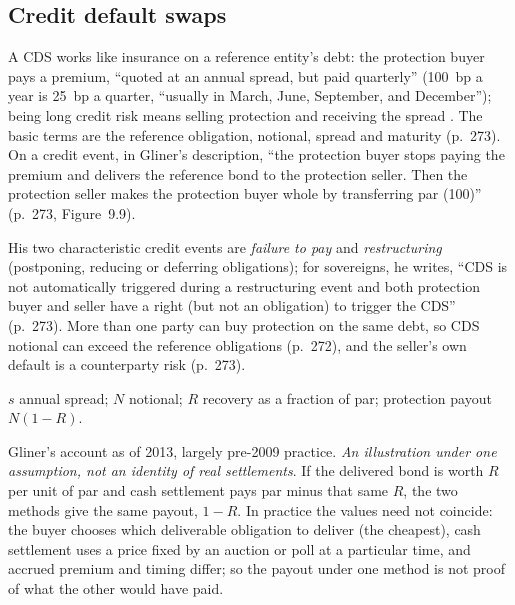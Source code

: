 \subsection{Credit default swaps}

\begin{qfmechanism}\label{mech:cds-contract-credit-events}
 A CDS works like insurance on a reference entity's debt: the protection buyer pays a premium, ``quoted at an annual spread, but paid quarterly'' (100~bp a year is 25~bp a quarter, ``usually in March, June, September, and December''); being long credit risk means selling protection and receiving the spread \citep[chap.~9, sec.\ ``Credit Default Swaps (CDS)'', PDF pp.~272--273]{s7-gliner}. The basic terms are the reference obligation, notional, spread and maturity (p.~273). On a credit event, in Gliner's description, ``the protection buyer stops paying the premium and delivers the reference bond to the protection seller. Then the protection seller makes the protection buyer whole by transferring par (100)'' (p.~273, Figure~9.9).

His two characteristic credit events are \emph{failure to pay} and \emph{restructuring} (postponing, reducing or deferring obligations); for sovereigns, he writes, ``CDS is not automatically triggered during a restructuring event and both protection buyer and seller have a right (but not an obligation) to trigger the CDS'' (p.~273). More than one party can buy protection on the same debt, so CDS notional can exceed the reference obligations (p.~272), and the seller's own default is a counterparty risk (p.~273).

 $s$ annual spread; $N$ notional; $R$ recovery as a fraction of par; protection payout $N(1-R)$.

 Gliner's account as of 2013, largely pre-2009 practice. \emph{An illustration under one assumption, not an identity of real settlements}. If the delivered bond is worth $R$ per unit of par and cash settlement pays par minus that same $R$, the two methods give the same payout, $1-R$. In practice the values need not coincide: the buyer chooses which deliverable obligation to deliver (the cheapest), cash settlement uses a price fixed by an auction or poll at a particular time, and accrued premium and timing differ; so the payout under one method is not proof of what the other would have paid.


\end{qfmechanism}
